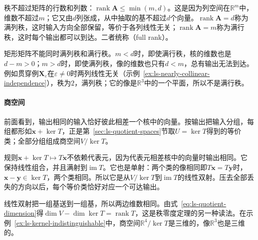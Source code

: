 秩不超过矩阵的行数和列数：$\operatorname{rank}\bm A\leq\min(m,d)$。这是因为列空间在$\mathbb R^m$中，维数不超过$m$；它又由$d$列张成，从中抽取的基不超过$d$个向量。$\operatorname{rank}\bm A=d$称为满列秩，这时输入方向全部保留，等价于各列线性无关；$\operatorname{rank}\bm A=m$称为满行秩，这时每个输出都可以到达。二者统称（full rank）。

矩形矩阵不能同时满列秩和满行秩。$m<d$时，即使满行秩，核的维数也是$d-m>0$；$m>d$时，即使满列秩，像的维数也只有$d<m$，总有输出无法到达。例如贯穿例$\bm X_\varepsilon$在$\varepsilon\neq0$时两列线性无关（示例~\ref{ex:ls-nearly-collinear-independence}），秩为$2$，满列秩；它的像是$\mathbb R^3$中的一个平面，所以不是满行秩。

\paragraph{商空间}
前面看到，输出相同的输入恰好彼此相差一个核中的向量。按输出把输入分组，每组都形如$\bm x+\ker T$，正是第~\ref{sec:ls-quotient-spaces}节取$U=\ker T$得到的等价类；全部分组组成商空间$V/\ker T$。

规则$\bm x+\ker T\mapsto T\bm x$不依赖代表元，因为代表元相差核中的向量时输出相同。它保持线性组合，并且满射到$\operatorname{im}T$。它也是单射：两个类的像相同即$T\bm x=T\bm y$时，$\bm x-\bm y\in\ker T$，两个类相同。所以它是从$V/\ker T$到$\operatorname{im}T$的线性双射。压去全部丢失的方向以后，每个等价类恰好对应一个可达输出。

线性双射把一组基送到一组基，所以两边维数相同。由式~\eqref{eq:ls-quotient-dimension}得$\dim V-\dim\ker T=\operatorname{rank}T$，这是秩零度定理的另一种读法。在示例~\ref{ex:ls-kernel-indistinguishable}中，商空间$\mathbb R^4/\ker T$是三维的，像$\mathbb R^3$也是三维的。

